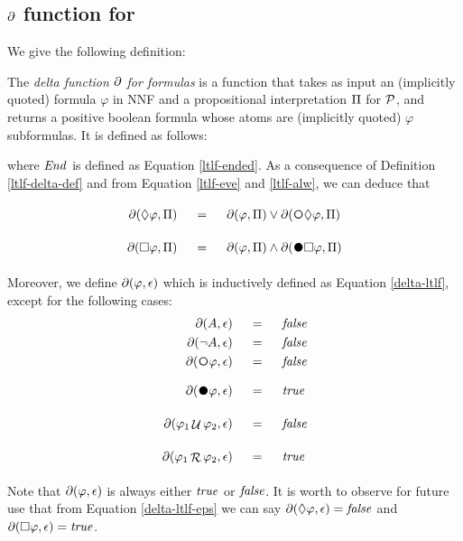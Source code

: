 \subsection{$\partial$ function for \LTLf}\label{ltlf-delta-section}
We give the following definition:
\begin{definition}\label{ltlf-delta-def}
	The \emph{delta function $\partial$ for \LTLf formulas} is a function that takes as input an (implicitly quoted) \LTLf
	formula $\varphi$ in NNF and a propositional interpretation $\Pi$ for $\mathcal{P}$, and returns a positive boolean formula whose atoms are (implicitly
	quoted) $\varphi$ subformulas. It is defined as follows:
	
	where $\mathit{End}$ is defined as Equation \ref{ltlf-ended}. As a consequence of Definition \ref{ltlf-delta-def} and from Equation \ref{ltlf-eve} and \ref{ltlf-alw}, we can deduce that 
	\begin{align*}
	\Dfun{\Diamond \varphi} 	\ind &= \ind   \Dfun{\varphi} \lOR \Dfun{\Next \Diamond \varphi}\\
	\Dfun{\Box \varphi} 	\ind &= \ind   \Dfun{\varphi} \lAND \Dfun{\Wnext \Box \varphi}
	\end{align*}
	
		
	Moreover, we define $\partial\lparen \varphi, \epsilon\rparen$ which is inductively defined as Equation \ref{delta-ltlf}, except for the following cases:
	\begin{align}
	\begin{aligned}
	\DfunEps{A} 			\ind &= \ind \false\\
	\DfunEps{\lnot A} 			\ind &= \ind  \false\\
	\DfunEps{\Next \varphi} 	\ind &= \ind   \false\\
	\DfunEps{\Wnext \varphi} 	\ind &= \ind   \true\\
	\DfunEps{\varphi_1 \lUntil \varphi_2} 	\ind &= \ind   \false\\
	\DfunEps{\varphi_1 \Release \varphi_2} 	\ind &= \ind   \true\\
	\label{delta-ltlf-eps}
	\end{aligned}					
	\end{align}
\end{definition}
Note that $\partial\lparen \varphi, \epsilon\rparen$ is always either $\mathit{true}$ or $\mathit{false}$. It is worth to observe for future use that from Equation \ref{delta-ltlf-eps} we can say $\partial\lparen \Diamond \varphi, \epsilon\rparen = \mathit{false}$ and $\partial\lparen \Box \varphi, \epsilon\rparen = \mathit{true}$.


